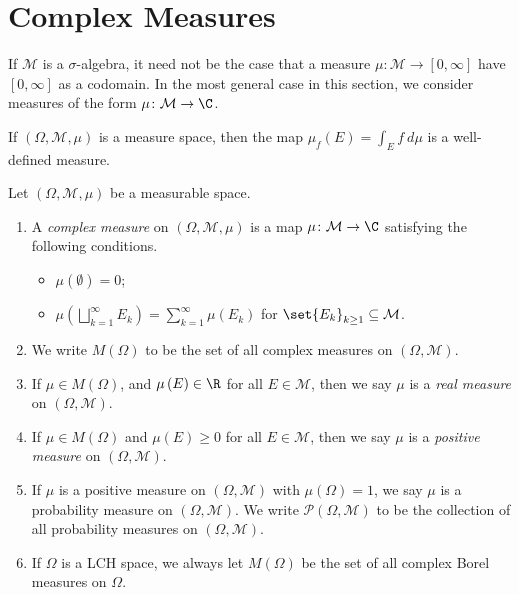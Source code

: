 \section{Complex Measures}%
If $\mathcal{M}$ is a $\sigma$-algebra, it need not be the case that a measure $\mu\colon \mathcal{M}\rightarrow [0,\infty]$ have $[0,\infty]$ as a codomain. In the most general case in this section, we consider measures of the form $\mu\colon \mathcal{M}\rightarrow \C$.
\begin{example}
  If $\left(\Omega,\mathcal{M},\mu\right)$ is a measure space, then the map $\mu_f(E) = \int_{E}^{} f\:d\mu$ is a well-defined measure.
\end{example}
\begin{definition}
  Let $\left(\Omega,\mathcal{M},\mu\right)$ be a measurable space.
  \begin{enumerate}[(1)]
    \item A \textit{complex measure} on $\left(\Omega,\mathcal{M},\mu\right)$ is a map $\mu\colon \mathcal{M}\rightarrow \C$ satisfying the following conditions.
      \begin{itemize}
        \item $\mu\left(\emptyset\right) = 0$;
        \item $\displaystyle \mu\left(\bigsqcup_{k=1}^{\infty}E_k\right) = \sum_{k=1}^{\infty}\mu\left(E_k\right)$ for $\set{E_k}_{k\geq 1}\subseteq \mathcal{M}$.
      \end{itemize}
    \item We write $M\left(\Omega\right)$ to be the set of all complex measures on $\left(\Omega,\mathcal{M}\right)$.
    \item If $\mu\in M\left(\Omega\right)$, and $\mu\left(E\right)\in \R$ for all $E\in \mathcal{M}$, then we say $\mu$ is a \textit{real measure} on $\left(\Omega,\mathcal{M}\right)$.
    \item If $\mu\in M\left(\Omega\right)$ and $\mu(E) \geq 0$ for all $E\in \mathcal{M}$, then we say $\mu$ is a \textit{positive measure} on $\left(\Omega,\mathcal{M}\right)$.
    \item If $\mu$ is a positive measure on $\left(\Omega,\mathcal{M}\right)$ with $\mu\left(\Omega\right) = 1$, we say $\mu$ is a probability measure on $\left(\Omega,\mathcal{M}\right)$. We write $\mathcal{P}\left(\Omega,\mathcal{M}\right)$ to be the collection of all probability measures on $\left(\Omega,\mathcal{M}\right)$.
    \item If $\Omega$ is a LCH space, we always let $M\left(\Omega\right)$ be the set of all complex Borel measures on $\Omega$.
  \end{enumerate}
\end{definition}
